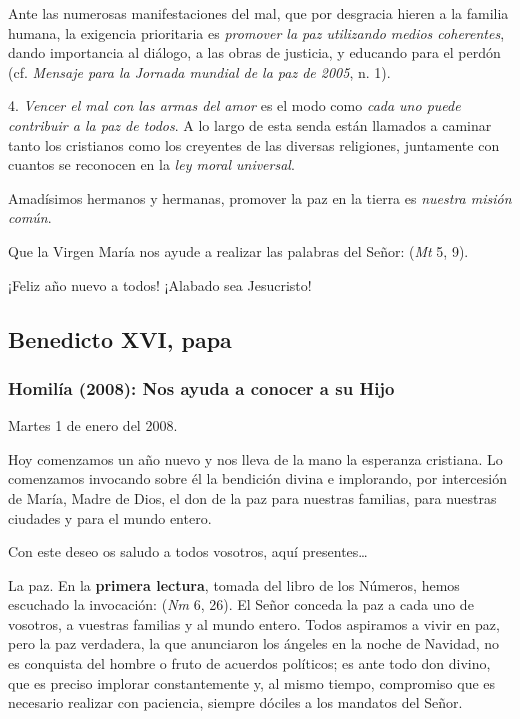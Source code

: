 Ante las numerosas manifestaciones del mal, que por desgracia hieren a la familia humana, la exigencia prioritaria es \emph{promover la paz utilizando medios coherentes}, dando importancia al diálogo, a las obras de justicia, y educando para el perdón (cf. \emph{Mensaje para la Jornada mundial de la paz de 2005}, n. 1).

4. \emph{Vencer el mal con las armas del amor} es el modo como \emph{cada uno puede contribuir a la paz de todos}. A lo largo de esta senda están llamados a caminar tanto los cristianos como los creyentes de las diversas religiones, juntamente con cuantos se reconocen en la \emph{ley moral universal}.

Amadísimos hermanos y hermanas, promover la paz en la tierra es \emph{nuestra misión común}.

Que la Virgen María nos ayude a realizar las palabras del Señor:  (\emph{Mt} 5, 9).

¡Feliz año nuevo a todos! ¡Alabado sea Jesucristo!

\subsection{Benedicto XVI, papa}

\subsubsection{Homilía (2008): Nos ayuda a conocer a su Hijo}

Martes 1 de enero del 2008.

Hoy comenzamos un año nuevo y nos lleva de la mano la esperanza cristiana. Lo comenzamos invocando sobre él la bendición divina e implorando, por intercesión de María, Madre de Dios, el don de la paz para nuestras familias, para nuestras ciudades y para el mundo entero.

Con este deseo os saludo a todos vosotros, aquí presentes\ldots{}

La paz. En la \textbf{primera lectura}, tomada del libro de los Números, hemos escuchado la invocación:  (\emph{Nm} 6, 26). El Señor conceda la paz a cada uno de vosotros, a vuestras familias y al mundo entero. Todos aspiramos a vivir en paz, pero la paz verdadera, la que anunciaron los ángeles en la noche de Navidad, no es conquista del hombre o fruto de acuerdos políticos; es ante todo don divino, que es preciso implorar constantemente y, al mismo tiempo, compromiso que es necesario realizar con paciencia, siempre dóciles a los mandatos del Señor.

